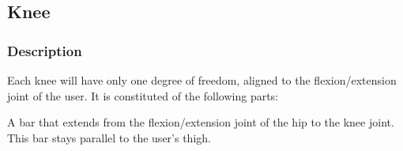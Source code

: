    \subsection{Knee}
   
   \subsubsection{Description}
   
   Each knee will have only one degree of freedom, aligned to the flexion/extension joint of the user. It is constituted of the following parts:
   
   A bar that extends from the flexion/extension joint of the hip to the knee joint. This bar stays parallel to the user's thigh.
   
   \begin{figure}[thpb]
      \centering
      

\end{figure}
